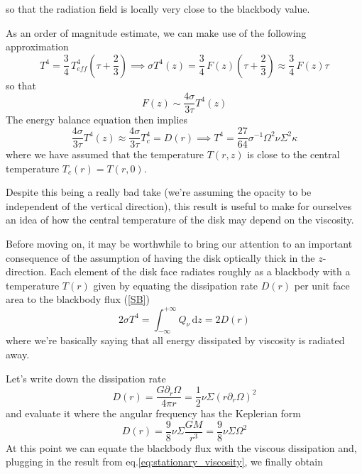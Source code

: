 so that the radiation field is locally very close to the blackbody value.
\par As an order of magnitude estimate, we can make use of the following approximation
\begin{equation*}
    T^{4} = \frac{3}{4} \,T_{eff}^{4}\left(\tau + \frac{2}{3}\right) \implies \sigma T^{4}(z) = \frac{3}{4} \, F(z)\left(\tau + \frac{2}{3}\right) \approx \frac{3}{4} \, F(z)\tau
\end{equation*}
so that 
\begin{equation*}
    F(z) \sim \frac{4\sigma}{3\tau}T^{4}(z)
\end{equation*}
The energy balance equation then implies 
\begin{equation*}
    \frac{4\sigma}{3\tau}T^{4}(z)\approx \frac{4\sigma}{3\tau}T^{4}_{c} = D(r) \implies T^{4} = \frac{27}{64}\sigma^{-1}\Omega^{2}\nu\Sigma^{2}\kappa
\end{equation*}
where we have assumed that the temperature $T(r,z)$ is close to the central temperature $ T_{c}(r) = T(r,0)$.
\par Despite this being a really bad take (we're assuming the opacity to be independent of the vertical direction), this result is useful to make for ourselves an idea of how the central temperature of the disk may depend on the viscosity.
\par Before moving on, it may be worthwhile to bring our attention to an important consequence of the assumption of 
having the disk optically thick in the $z$-direction.
Each element of the disk face radiates roughly as a blackbody with a temperature $T(r)$ given by equating the dissipation rate $D(r)$ per unit face area to the blackbody flux (\ref{SB})
\begin{equation*}
    2\sigma T^{4} = \int_{-\infty}^{+\infty}Q_{\nu}\,\text{d}z = 2D(r)
\end{equation*}
where we're basically saying that all energy dissipated by viscosity is radiated away.
\par Let's write down the dissipation rate 
\begin{equation*}
    D(r) = \frac{G\partial_{r}\Omega}{4\pi r} = \frac{1}{2}\nu\Sigma(r\partial_{r}\Omega)^{2}
\end{equation*}
and evaluate it where the angular frequency has the Keplerian form
\begin{equation*}
    D(r) = \frac{9}{8}\nu\Sigma\frac{GM}{r^{3}} = \frac{9}{8}\nu\Sigma\Omega^{2}
\end{equation*}
At this point we can equate the blackbody flux with the viscous dissipation and, plugging in the result from eq.\ref{eq:stationary_viscosity}, we finally obtain
